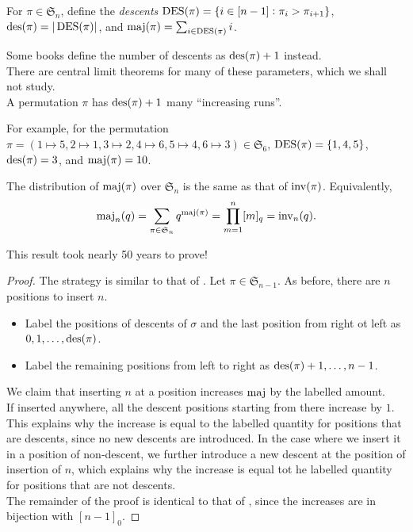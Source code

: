	\begin{definition}[Descent]
		\label{def: descent}
		For $\pi \in \mathfrak{S}_n$, define the \emph{descents} $\operatorname{DES}(\pi) = \{i \in [n-1] : \pi_i > \pi_{i+1}\}$, $\operatorname{des}(\pi) = |\operatorname{DES}(\pi)|$, and $\operatorname{maj}(\pi) = \sum_{i \in \operatorname{DES}(\pi)} i$. 
	\end{definition}
	Some books define the number of descents as $\operatorname{des}(\pi)+1$ instead.\\
	There are central limit theorems for many of these parameters, which we shall not study.\\
	A permutation $\pi$ has $\operatorname{des}(\pi) + 1$ many ``increasing runs''.

	For example, for the permutation $\pi = (1\mapsto 5,2\mapsto1,3\mapsto2,4\mapsto6,5\mapsto4,6\mapsto3) \in \mathfrak{S}_6$, $\operatorname{DES}(\pi) = \{1,4,5\}$, $\operatorname{des}(\pi) = 3$, and $\operatorname{maj}(\pi) = 10$.

	\begin{fprop}
		\label{prop: maj n}
		The distribution of $\operatorname{maj}(\pi)$ over $\mathfrak{S}_n$ is the same as that of $\operatorname{inv}(\pi)$. Equivalently,
		\[ \operatorname{maj}_n(q) = \sum_{\pi \in \mathfrak{S}_n} q^{\operatorname{maj}(\pi)} = \prod_{m=1}^n [m]_q = \operatorname{inv}_n(q). \] 
	\end{fprop}
	This result took nearly 50 years to prove!
	\begin{proof}
		The strategy is similar to that of . Let $\pi \in \mathfrak{S}_{n-1}$. As before, there are $n$ positions to insert $n$.
		\begin{itemize}
			\item Label the positions of descents of $\sigma$ and the last position from right ot left as $0,1,\ldots,\operatorname{des}(\pi)$.
			\item Label the remaining positions from left to right as $\operatorname{des}(\pi)+1,\ldots,n-1$.
		\end{itemize}
		We claim that inserting $n$ at a position increases $\operatorname{maj}$ by the labelled amount.\\
		If inserted anywhere, all the descent positions starting from there increase by $1$. This explains why the increase is equal to the labelled quantity for positions that are descents, since no new descents are introduced. In the case where we insert it in a position of non-descent, we further introduce a new descent at the position of insertion of $n$, which explains why the increase is equal tot he labelled quantity for positions that are not descents.\\
		The remainder of the proof is identical to that of , since the increases are in bijection with $[n-1]_0$.
	\end{proof}

